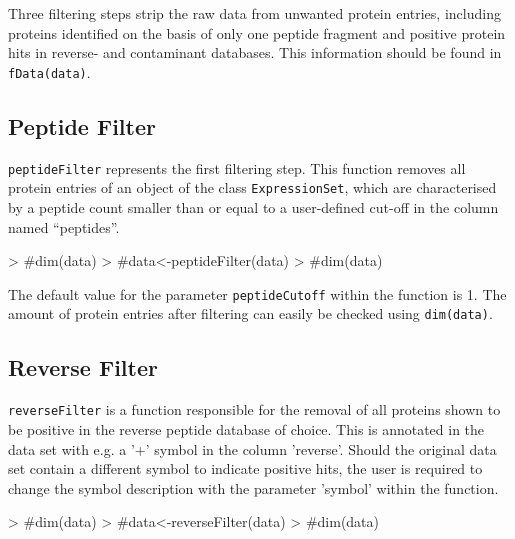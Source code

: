 \documentclass[a4paper,11pt]{article}
\newcommand{\Robject}[1]{{\texttt{#1}}}
\newcommand{\Rfunction}[1]{{\texttt{#1}}}
\begin{document}
Three filtering steps strip the raw data from unwanted protein entries, including proteins identified on the basis of only one peptide fragment and positive protein hits in reverse- and contaminant databases. This information should be found in \Rfunction{fData(data)}.

\subsection{Peptide Filter}

\Rfunction{peptideFilter} represents the first filtering step. This function removes all protein entries of an object of the class \Robject{ExpressionSet}, which are characterised by a peptide count smaller than or equal to a user-defined cut-off in the column named ``peptides''.

\begin{Schunk}
\begin{Sinput}
> #dim(data)
> #data<-peptideFilter(data)
> #dim(data)
\end{Sinput}
\end{Schunk}

The default value for the parameter \Robject{peptideCutoff} within the function is 1. The amount of protein entries after filtering can easily be checked using \Rfunction{dim(data)}.

\subsection{Reverse Filter}

\Rfunction{reverseFilter} is a function responsible for the removal of all proteins shown to be positive in the reverse peptide database of choice. This is annotated in the data set with e.g. a '+' symbol in the column 'reverse'. Should the original data set contain a different symbol to indicate positive hits, the user is required to change the symbol description with 
the parameter 'symbol' within the function.

\begin{Schunk}
\begin{Sinput}
> #dim(data)
> #data<-reverseFilter(data)
> #dim(data)
\end{Sinput}
\end{Schunk}
\end{document}
